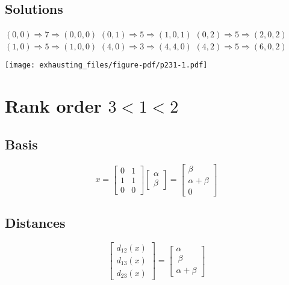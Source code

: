 \documentclass[
  12pt,
  letterpaper,
  DIV=11,
  numbers=noendperiod]{scrartcl}
\begin{document}
\subsection{Solutions}\label{solutions-3}

\((0,0)\Rightarrow 7\Rightarrow(0,0,0)\)\newline
\((0,1)\Rightarrow 5\Rightarrow(1,0,1)\)\newline
\((0,2)\Rightarrow 5\Rightarrow(2,0,2)\)\newline
\((1,0)\Rightarrow 5\Rightarrow(1,0,0)\)\newline
\((4,0)\Rightarrow 3\Rightarrow(4,4,0)\)\newline
\((4,2)\Rightarrow 5\Rightarrow(6,0,2)\)\newline

\begin{center}
\texttt{[image: exhausting\_files/figure-pdf/p231-1.pdf]}
\end{center}

\pagebreak

\section{\texorpdfstring{Rank order
\(3<1<2\)}{Rank order 3\textless1\textless2}}\label{rank-order-312}

\subsection{Basis}\label{basis-4}

\[
x=\begin{bmatrix}
0&1\\
1&1\\
0&0
\end{bmatrix}
\begin{bmatrix}
\alpha\\
\beta
\end{bmatrix}=
\begin{bmatrix}
\beta\\
\alpha+\beta\\
0
\end{bmatrix}
\]

\subsection{Distances}\label{distances-4}

\[
\begin{bmatrix}
d_{12}(x)\\
d_{13}(x)\\
d_{23}(x)
\end{bmatrix}
=\begin{bmatrix}
\alpha\\\
\beta\\
\alpha+\beta
\end{bmatrix}
\]
\end{document}
